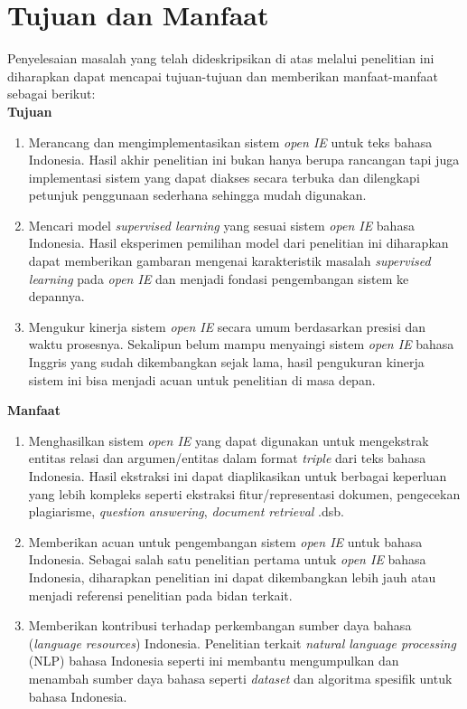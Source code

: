 \section{Tujuan dan Manfaat}

Penyelesaian masalah yang telah dideskripsikan di atas melalui penelitian ini diharapkan dapat mencapai tujuan-tujuan dan memberikan manfaat-manfaat sebagai berikut:\\

\textbf{Tujuan}

\begin{enumerate}
	\item Merancang dan mengimplementasikan sistem \textit{open IE} untuk teks bahasa Indonesia. Hasil akhir penelitian ini bukan hanya berupa rancangan tapi juga implementasi sistem yang dapat diakses secara terbuka dan dilengkapi petunjuk penggunaan sederhana sehingga mudah digunakan.
	
	\item Mencari model \textit{supervised learning} yang sesuai sistem \textit{open IE} bahasa Indonesia. Hasil eksperimen pemilihan model dari penelitian ini diharapkan dapat memberikan gambaran mengenai karakteristik masalah \textit{supervised learning} pada \textit{open IE} dan menjadi fondasi pengembangan sistem ke depannya.
	
	\item Mengukur kinerja sistem \textit{open IE} secara umum berdasarkan presisi dan waktu prosesnya. Sekalipun belum mampu menyaingi sistem \textit{open IE} bahasa Inggris yang sudah dikembangkan sejak lama, hasil pengukuran kinerja sistem ini bisa menjadi acuan untuk penelitian di masa depan.
\end{enumerate}

\textbf{Manfaat}

\begin{enumerate}
	\item Menghasilkan sistem \textit{open IE} yang dapat digunakan untuk mengekstrak entitas relasi dan argumen/entitas dalam format \textit{triple} dari teks bahasa Indonesia. Hasil ekstraksi ini dapat diaplikasikan untuk berbagai keperluan yang lebih kompleks seperti ekstraksi fitur/representasi dokumen, pengecekan plagiarisme, \textit{question answering}, \textit{document retrieval} .dsb.
	
	\item Memberikan acuan untuk pengembangan sistem \textit{open IE} untuk bahasa Indonesia. Sebagai salah satu penelitian pertama untuk \textit{open IE} bahasa Indonesia, diharapkan penelitian ini dapat dikembangkan lebih jauh atau menjadi referensi penelitian pada bidan terkait.
	
	\item Memberikan kontribusi terhadap perkembangan sumber daya bahasa (\textit{language resources}) Indonesia. Penelitian terkait \textit{natural language processing} (NLP) bahasa Indonesia seperti ini membantu mengumpulkan dan menambah sumber daya bahasa seperti \textit{dataset} dan algoritma spesifik untuk bahasa Indonesia.
\end{enumerate}

